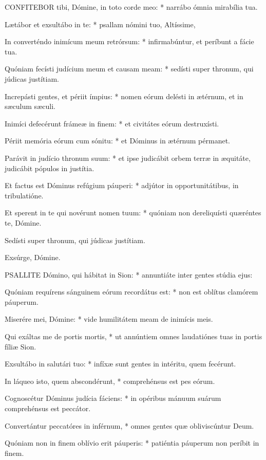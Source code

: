 
\lettrine[lines=2]{C}{ONFITEBOR} tibi, Dómine, in toto corde meo: * narrábo ómnia mirabília tua.

Lætábor et exsultábo in te: * psallam nómini tuo, Altíssime,

In converténdo inimícum meum retrórsum: * infirmabúntur, et períbunt a fácie tua.

Quóniam fecísti judícium meum et causam meam: * sedísti super thronum, qui júdicas justítiam.

Increpásti gentes, et périit ímpius: * nomen eórum delésti in ætérnum, et in sæculum sæculi.

Inimíci defecérunt frámeæ in finem: * et civitátes eórum destruxísti.

Périit memória eórum cum sónitu: * et Dóminus in ætérnum pérmanet.

Parávit in judício thronum suum: * et ipse judicábit orbem terræ in æquitáte, judicábit pópulos in justítia.

Et factus est Dóminus refúgium páuperi: * adjútor in opportunitátibus, in tribulatióne.

Et sperent in te qui novérunt nomen tuum: * quóniam non dereliquísti quæréntes te, Dómine.

 Sedísti super thronum, qui júdicas justítiam.

 Exsúrge, Dómine.


\lettrine[lines=2]{P}{SALLITE} Dómino, qui hábitat in Sion: * annuntiáte inter gentes stúdia ejus:

Quóniam requírens sánguinem eórum recordátus est: * non est oblítus clamórem páuperum.

Miserére mei, Dómine: * vide humilitátem meam de inimícis meis.

Qui exáltas me de portis mortis, * ut annúntiem omnes laudatiónes tuas in portis fíliæ Sion.

Exsultábo in salutári tuo: * infíxæ sunt gentes in intéritu, quem fecérunt.

In láqueo isto, quem abscondérunt, * comprehénsus est pes eórum.

Cognoscétur Dóminus judícia fáciens: * in opéribus mánuum suárum comprehénsus est peccátor.

Convertántur peccatóres in inférnum, * omnes gentes quæ obliviscúntur Deum.

Quóniam non in finem oblívio erit páuperis: * patiéntia páuperum non períbit in finem.

